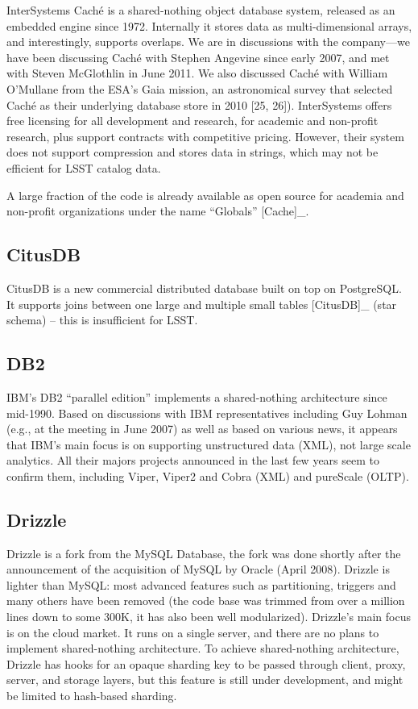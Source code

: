 \documentclass[DM,lsstdraft,toc]{lsstdoc}
\begin{document}
InterSystems Caché is a shared-nothing object database system, released
as an embedded engine since 1972. Internally it stores data as
multi-dimensional arrays, and interestingly, supports overlaps. We are
in discussions with the company---we have been discussing Caché with
Stephen Angevine since early 2007, and met with Steven McGlothlin in
June 2011. We also discussed Caché with William O'Mullane from the ESA's
Gaia mission, an astronomical survey that selected Caché as their
underlying database store in 2010 {[}25, 26{]}). InterSystems offers
free licensing for all development and research, for academic and
non-profit research, plus support contracts with competitive pricing.
However, their system does not support compression and stores data in
strings, which may not be efficient for LSST catalog data.

A large fraction of the code is already available as open source for
academia and non-profit organizations under the name ``Globals''
{[}Cache{]}\_.

\subsection{CitusDB}\label{citusdb}

CitusDB is a new commercial distributed database built on top on
PostgreSQL. It supports joins between one large and multiple small
tables {[}CitusDB{]}\_ (star schema) -- this is insufficient for LSST.

\subsection{DB2}\label{db2}

IBM's DB2 ``parallel edition'' implements a shared-nothing architecture
since mid-1990. Based on discussions with IBM representatives including
Guy Lohman (e.g., at the meeting in June 2007) as well as based on
various news, it appears that IBM's main focus is on supporting
unstructured data (XML), not large scale analytics. All their majors
projects announced in the last few years seem to confirm them, including
Viper, Viper2 and Cobra (XML) and pureScale (OLTP).

\subsection{Drizzle}\label{drizzle}

Drizzle is a fork from the MySQL Database,
the fork was done shortly after the announcement of the acquisition of
MySQL by Oracle (April 2008). Drizzle is
lighter than MySQL: most advanced features such as partitioning,
triggers and many others have been removed (the code base was trimmed
from over a million lines down to some 300K, it has also been well
modularized). Drizzle's main focus is on the
cloud market. It runs on a single server, and there are no plans to
implement shared-nothing architecture. To achieve shared-nothing
architecture, Drizzle has hooks for an
opaque sharding key to be passed through client, proxy, server, and
storage layers, but this feature is still under development, and might
be limited to hash-based sharding.
\end{document}
